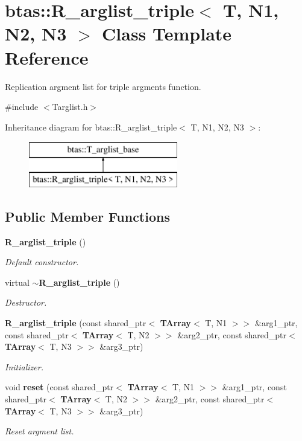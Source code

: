 \section{btas\-:\-:R\-\_\-arglist\-\_\-triple$<$ T, N1, N2, N3 $>$ Class Template Reference}
\label{dd/d0a/classbtas_1_1R__arglist__triple}


Replication argment list for triple argments function.  




{\ttfamily \#include $<$Targlist.\-h$>$}

Inheritance diagram for btas\-:\-:R\-\_\-arglist\-\_\-triple$<$ T, N1, N2, N3 $>$\-:\begin{figure}[H]
\begin{center}
\leavevmode
\includegraphics[height=2.000000cm]{dd/d0a/classbtas_1_1R__arglist__triple}
\end{center}
\end{figure}
\subsection*{Public Member Functions}
\begin{DoxyCompactItemize}
\item 
{\bf R\-\_\-arglist\-\_\-triple} ()
\begin{DoxyCompactList}\small\item\em Default constructor. \end{DoxyCompactList}\item 
virtual {\bf $\sim$\-R\-\_\-arglist\-\_\-triple} ()
\begin{DoxyCompactList}\small\item\em Destructor. \end{DoxyCompactList}\item 
{\bf R\-\_\-arglist\-\_\-triple} (const shared\-\_\-ptr$<$ {\bf T\-Array}$<$ T, N1 $>$$>$ \&arg1\-\_\-ptr, const shared\-\_\-ptr$<$ {\bf T\-Array}$<$ T, N2 $>$$>$ \&arg2\-\_\-ptr, const shared\-\_\-ptr$<$ {\bf T\-Array}$<$ T, N3 $>$$>$ \&arg3\-\_\-ptr)
\begin{DoxyCompactList}\small\item\em Initializer. \end{DoxyCompactList}\item 
void {\bf reset} (const shared\-\_\-ptr$<$ {\bf T\-Array}$<$ T, N1 $>$$>$ \&arg1\-\_\-ptr, const shared\-\_\-ptr$<$ {\bf T\-Array}$<$ T, N2 $>$$>$ \&arg2\-\_\-ptr, const shared\-\_\-ptr$<$ {\bf T\-Array}$<$ T, N3 $>$$>$ \&arg3\-\_\-ptr)
\begin{DoxyCompactList}\small\item\em Reset argment list. \end{DoxyCompactList}\end{DoxyCompactItemize}

